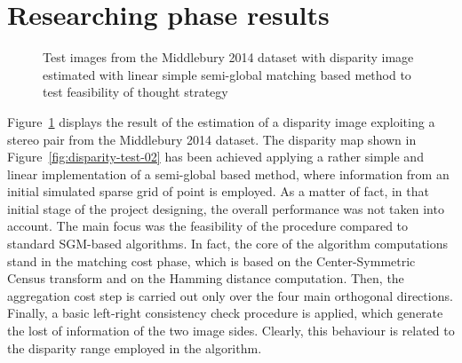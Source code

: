 \section{Researching phase results}
\label{section:research-phase-results}

\begin{figure}[t]
	\centering
\caption{Test images from the Middlebury 2014 dataset with disparity image estimated with linear simple semi-global matching based method to test feasibility of thought strategy}
\label{fig:test-matlab-02}
\end{figure}

Figure~\ref{fig:test-matlab-02} displays the result of the estimation of a disparity image exploiting a stereo pair from the Middlebury 2014 dataset.
The disparity map shown in Figure~\ref{fig:disparity-test-02} has been achieved applying a rather simple and linear implementation of a semi-global based method, where information from an initial simulated sparse grid of point is employed.
As a matter of fact, in that initial stage of the project designing, the overall performance was not taken into account.
The main focus was the feasibility of the procedure compared to standard SGM-based algorithms. 
In fact, the core of the algorithm computations stand in the matching cost phase, which is based on the Center-Symmetric Census transform and on the Hamming distance computation.
Then, the aggregation cost step is carried out only over the four main orthogonal directions.
Finally, a basic left-right consistency check procedure is applied, which generate the lost of information of the two image sides.
Clearly, this behaviour is related to the disparity range employed in the algorithm.

